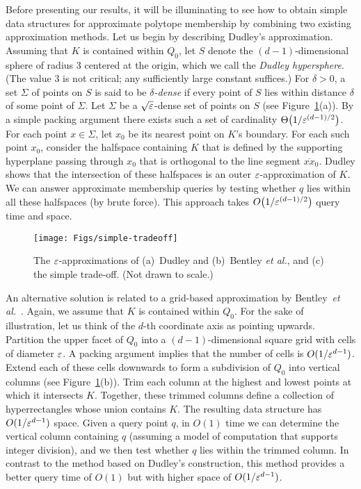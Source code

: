 \documentclass[11pt]{article}   \usepackage[letterpaper,hmargin=2.1cm,vmargin=3cm]{geometry}
\newcommand{\etal}{\textit{et al.}}
\begin{document}
Before presenting our results, it will be illuminating to see how to obtain simple data structures for approximate polytope membership by combining two existing approximation methods. Let us begin by describing Dudley's approximation. Assuming that $K$ is contained within $Q_0$, let $S$ denote the $(d-1)$-dimensional sphere of radius $3$ centered at the origin, which we call the \emph{Dudley hypersphere}. (The value $3$ is not critical; any sufficiently large constant suffices.) For $\delta > 0$, a set $\Sigma$ of points on $S$ is said to be \emph{$\delta$-dense} if every point of $S$ lies within distance $\delta$ of some point of $\Sigma$. Let $\Sigma$ be a $\sqrt{\varepsilon}$-dense set of points on $S$ (see Figure~\ref{fig:dudley-bentley}(a)). By a simple packing argument there exists such a set of cardinality $\Theta\big(1/\varepsilon^{(d-1)/2}\big)$. For each point $x \in \Sigma$, let $x_0$ be its nearest point on $K$'s boundary. For each such point $x_0$, consider the halfspace containing $K$ that is defined by the supporting hyperplane passing through $x_0$ that is orthogonal to the line segment $\overline{x x}_0$. Dudley shows that the intersection of these halfspaces is an outer $\varepsilon$-approximation of $K$. We can answer approximate membership queries by testing whether $q$ lies within all these halfspaces (by brute force). This approach takes $O\big(1/\varepsilon^{(d-1)/2}\big)$ query time and space.

\begin{figure}[htbp]
  \centerline{\texttt{[image: Figs/simple-tradeoff]}}
  \caption{The $\varepsilon$-approximations of (a)~Dudley and (b)~Bentley {\etal}, and (c) the simple trade-off. (Not drawn to scale.)}
  \label{fig:dudley-bentley}
\end{figure}


An alternative solution is related to a grid-based approximation by Bentley~{\etal}~\cite{BFP}. Again, we assume that $K$ is contained within $Q_0$. For the sake of illustration, let us think of the $d$-th coordinate axis as pointing upwards. Partition the upper facet of $Q_0$ into a $(d-1)$-dimensional square grid with cells of diameter $\varepsilon$. A packing argument implies that the number of cells is $O(1/\varepsilon^{d-1})$. Extend each of these cells downwards to form a subdivision of $Q_0$ into vertical columns (see Figure~\ref{fig:dudley-bentley}(b)). Trim each column at the highest and lowest points at which it intersects $K$. Together, these trimmed columns define a collection of hyperrectangles whose union contains $K$. The resulting data structure has $O(1/\varepsilon^{d-1})$ space. Given a query point $q$, in $O(1)$ time we can determine the vertical column containing $q$ (assuming a model of computation that supports integer division), and we then test whether $q$ lies within the trimmed column. In contrast to the method based on Dudley's construction, this method provides a better query time of $O(1)$ but with higher space of $O(1/\varepsilon^{d-1})$.
\end{document}
